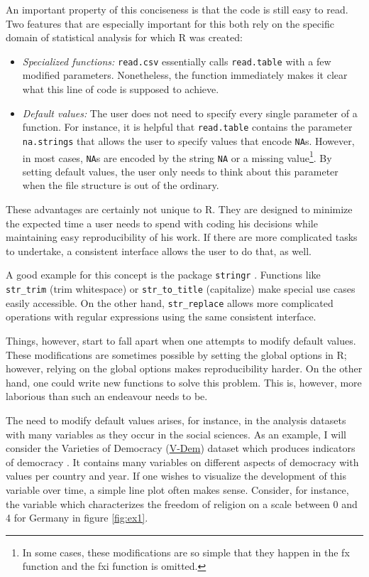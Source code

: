 \documentclass[]{report}
\let\rmarkdownfootnote\footnote%
\def\footnote{\protect\rmarkdownfootnote}
\theoremstyle{definition}
\theoremstyle{definition}
\theoremstyle{definition}
\theoremstyle{remark}
\begin{document}
An important property of this conciseness is that the code is still easy
to read. Two features that are especially important for this both rely
on the specific domain of statistical analysis for which R was created:

\begin{itemize}
\item
  \emph{Specialized functions:} \texttt{read.csv} essentially calls
  \texttt{read.table} with a few modified parameters. Nonetheless, the
  function immediately makes it clear what this line of code is supposed
  to achieve.
\item
  \emph{Default values:} The user does not need to specify every single
  parameter of a function. For instance, it is helpful that
  \texttt{read.table} contains the parameter \texttt{na.strings} that
  allows the user to specify values that encode \texttt{NA}s. However,
  in most cases, \texttt{NA}s are encoded by the string \texttt{NA} or a
  missing value\footnote{In some cases, these modifications are so
    simple that they happen in the fx function and the fxi function is
    omitted.}. By setting default values, the user only needs to think
  about this parameter when the file structure is out of the ordinary.
\end{itemize}

These advantages are certainly not unique to R. They are designed to
minimize the expected time a user needs to spend with coding his
decisions while maintaining easy reproducibility of his work. If there
are more complicated tasks to undertake, a consistent interface allows
the user to do that, as well.

A good example for this concept is the package \texttt{stringr}
\citep{stringr}. Functions like \texttt{str\_trim} (trim whitespace) or
\texttt{str\_to\_title} (capitalize) make special use cases easily
accessible. On the other hand, \texttt{str\_replace} allows more
complicated operations with regular expressions using the same
consistent interface.

Things, however, start to fall apart when one attempts to modify default
values. These modifications are sometimes possible by setting the global
options in R; however, relying on the global options makes
reproducibility harder. On the other hand, one could write new functions
to solve this problem. This is, however, more laborious than such an
endeavour needs to be.

The need to modify default values arises, for instance, in the analysis
datasets with many variables as they occur in the social sciences. As an
example, I will consider the Varieties of Democracy
(\href{v-dem.net}{V-Dem}) dataset which produces indicators of democracy
\citep[\citet{Pemstein2018}]{vdem2018}. It contains many variables on
different aspects of democracy with values per country and year. If one
wishes to visualize the development of this variable over time, a simple
line plot often makes sense. Consider, for instance, the variable which
characterizes the freedom of religion on a scale between 0 and 4 for
Germany in figure \ref{fig:ex1}.
\end{document}
